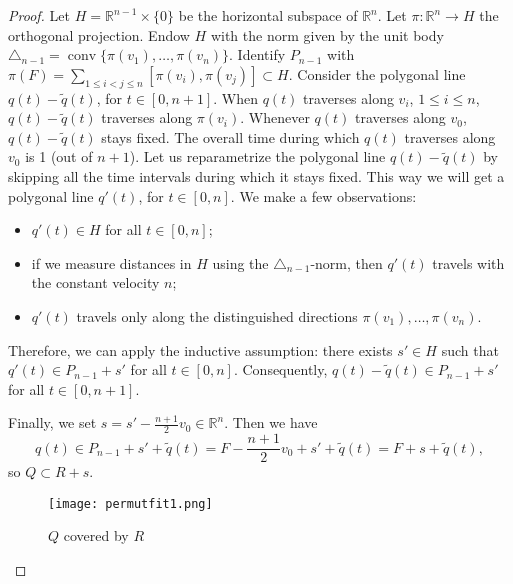 \documentclass[12pt,a4paper,oneside]{amsart}
\theoremstyle{definition}
\theoremstyle{remark}
\numberwithin{equation}{section}
\DeclareMathOperator{\conv}{conv}
\begin{document}
\begin{proof}
%
Let $H = \mathbb{R}^{n-1} \times \{0\}$ be the horizontal subspace of $\mathbb{R}^n$. Let $\pi: \mathbb{R}^n \to H$ the orthogonal projection. Endow $H$ with the norm given by the unit body $\triangle_{n-1} = \conv\{\pi(v_1), \ldots, \pi(v_n)\}$. Identify $P_{n-1}$ with $\pi\left(F\right) = \sum\limits_{1\le i < j\le n} [\pi(v_i), \pi(v_j)] \subset H$. Consider the polygonal line $q(t) - \widetilde q(t)$, for $t\in[0,n+1]$. When $q(t)$ traverses along $v_i$, $1\le i \le n$, $q(t) - \widetilde q(t)$ traverses along $\pi(v_i)$. Whenever $q(t)$ traverses along $v_0$, $q(t) - \widetilde q(t)$ stays fixed. The overall time during which $q(t)$ traverses along $v_0$ is 1 (out of $n+1$). Let us reparametrize the polygonal line $q(t) - \widetilde q(t)$ by skipping all the time intervals during which it stays fixed. This way we will get a polygonal line $q'(t)$, for $t \in [0,n]$.
We make a few observations:
\begin{itemize}
\item $q'(t) \in H$ for all $t\in[0,n]$;
\item if we measure distances in $H$ using the $\triangle_{n-1}$-norm, then $q'(t)$ travels with the constant velocity $n$;
\item $q'(t)$ travels only along the distinguished directions $\pi(v_1), \ldots, \pi(v_n)$.
\end{itemize}
Therefore, we can apply the inductive assumption: there exists $s' \in H$ such that $q'(t) \in P_{n-1} + s'$ for all $t \in [0,n]$. Consequently, $q(t) - \widetilde q(t) \in P_{n-1} + s'$ for all $t \in [0,n+1]$.

Finally, we set $s = s' - \frac{n+1}{2} v_0 \in \mathbb{R}^n$. Then we have
$$
q(t) \in P_{n-1} + s' + \widetilde q(t) = F - \frac{n+1}{2} v_0 + s' + \widetilde q(t) = F+s+\widetilde q(t),
$$
so $Q \subset R + s$.


\begin{figure}[h]
\centering
\texttt{[image: permutfit1.png]}
\caption{$Q$ covered by $R$}
\label{pic:permutfit1}
\end{figure}


\end{proof}
\end{document}
